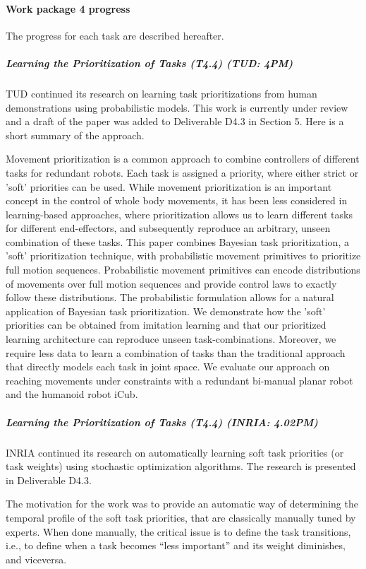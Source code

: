 

\paragraph{Work package 4 progress}

The progress for each task are described hereafter.

\subparagraph{Learning the Prioritization of Tasks (T4.4) (TUD: 4PM)}

TUD continued its research on learning task prioritizations from human demonstrations using probabilistic models. This work is currently under review and 
a draft of the paper was added to Deliverable D4.3 in Section 5.  Here is a short summary of the approach. 

Movement prioritization is a common approach
to combine controllers of different tasks for redundant robots.
Each task is assigned a priority, where either strict or 'soft'
priorities can be used. While movement prioritization is an
important concept in the control of whole body movements, it
has been less considered in learning-based approaches, where
prioritization allows us to learn different tasks for different
end-effectors, and subsequently reproduce an arbitrary, unseen
combination of these tasks. This paper combines Bayesian task
prioritization, a 'soft' prioritization technique, with probabilistic
movement primitives to prioritize full motion sequences.
Probabilistic movement primitives can encode distributions of
movements over full motion sequences and provide control
laws to exactly follow these distributions. The probabilistic
formulation allows for a natural application of Bayesian task
prioritization. We demonstrate how the 'soft' priorities can
be obtained from imitation learning and that our prioritized
learning architecture can reproduce unseen task-combinations.
Moreover, we require less data to learn a combination of tasks
than the traditional approach that directly models each task in
joint space. We evaluate our approach on reaching movements
under constraints with a redundant bi-manual planar robot
and the humanoid robot iCub. 

\subparagraph{Learning the Prioritization of Tasks (T4.4) (INRIA: 4.02PM)}

INRIA continued its research on automatically learning soft task priorities (or task weights) using stochastic optimization algorithms. The research is presented in Deliverable D4.3. 

The motivation for the work was to provide an automatic way of determining the temporal profile of the soft task priorities, that are classically manually tuned by experts. When done manually, the critical issue is to define the task transitions, i.e., to define when a task becomes ``less important'' and its weight diminishes, and viceversa.

